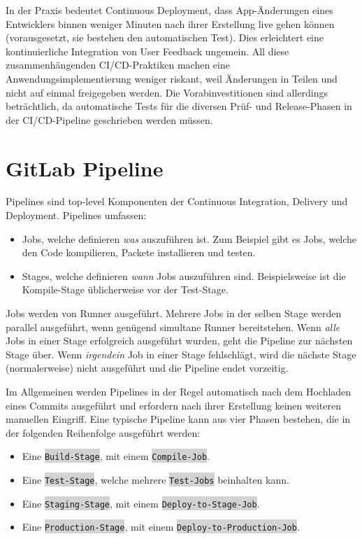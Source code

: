 In der Praxis bedeutet Continuous Deployment, dass App-Änderungen eines Entwicklers binnen weniger Minuten nach ihrer Erstellung live gehen können (vorausgesetzt, sie bestehen den automatischen Test). Dies erleichtert eine kontinuierliche Integration von User Feedback ungemein. All diese zusammenhängenden CI/CD-Praktiken machen eine Anwendungsimplementierung weniger riskant, weil Änderungen in Teilen und nicht auf einmal freigegeben werden. Die Vorabinvestitionen sind allerdings beträchtlich, da automatische Tests für die diversen Prüf- und Release-Phasen in der CI/CD-Pipeline geschrieben werden müssen.\autocite{whatIsCICD}

\section{GitLab Pipeline}

Pipelines sind top-level Komponenten der Continuous Integration, Delivery und Deployment. Pipelines umfassen:\autocite{gitlabPipelines}

\begin{itemize}
	\item Jobs, welche definieren \textit{was} auszuführen ist. Zum Beispiel gibt es Jobs, welche den Code kompilieren, Packete installieren und testen.
	\item Stages, welche definieren \textit{wann} Jobs auszuführen sind. Beispielsweise ist die Kompile-Stage üblicherweise vor der Test-Stage.
\end{itemize}

Jobs werden von Runner ausgeführt. Mehrere Jobs in der selben Stage werden parallel ausgeführt, wenn genügend simultane Runner bereitstehen.
Wenn \textit{alle} Jobs in einer Stage erfolgreich ausgeführt wurden, geht die Pipeline zur nächsten Stage über.
Wenn \textit{irgendein} Job in einer Stage fehlschlägt, wird die nächste Stage (normalerweise) nicht ausgeführt und die Pipeline endet vorzeitig.\autocite{gitlabPipelines}

\newpage

Im Allgemeinen werden Pipelines in der Regel automatisch  nach dem Hochladen eines Commits ausgeführt und erfordern nach ihrer Erstellung keinen weiteren manuellen Eingriff.
Eine typische Pipeline kann aus vier Phasen bestehen, die in der folgenden Reihenfolge ausgeführt werden:\autocite{gitlabPipelines}

\begin{itemize}
	\item Eine \colorbox{lightgray}{\texttt{Build-Stage}}, mit einem \colorbox{lightgray}{\texttt{Compile-Job}}.
	\item Eine \colorbox{lightgray}{\texttt{Test-Stage}}, welche mehrere \colorbox{lightgray}{\texttt{Test-Jobs}} beinhalten kann.
	\item Eine \colorbox{lightgray}{\texttt{Staging-Stage}}, mit einem \colorbox{lightgray}{\texttt{Deploy-to-Stage-Job}}.
	\item Eine \colorbox{lightgray}{\texttt{Production-Stage}}, mit einem \colorbox{lightgray}{\texttt{Deploy-to-Production-Job}}.
\end{itemize}

